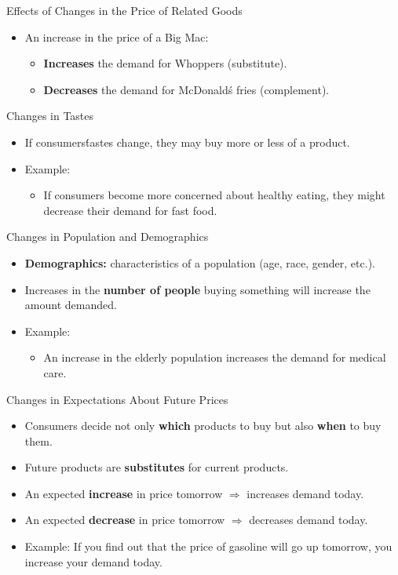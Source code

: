 \documentclass[aspectratio=169]{beamer}
\begin{document}
\begin{frame}{Effects of Changes in the Price of Related Goods}
\transfade
\begin{itemize}[<+->]
  \item An increase in the price of a Big Mac:
  \begin{itemize}[<+->]
    \item \textbf{Increases} the demand for Whoppers (substitute).
    \item \textbf{Decreases} the demand for McDonald\'s fries (complement).
  \end{itemize}
\end{itemize}
\end{frame}

\begin{frame}{Changes in Tastes}
\transfade
\begin{itemize}[<+->]
  \item If consumers\' tastes change, they may buy more or less of a product.
  \item Example:
  \begin{itemize}[<+->]
    \item If consumers become more concerned about healthy eating, they might decrease their demand for fast food.
  \end{itemize}
\end{itemize}
\end{frame}

\begin{frame}{Changes in Population and Demographics}
\transfade
\begin{itemize}[<+->]
  \item \textbf{Demographics:} characteristics of a population (age, race, gender, etc.).
  \item Increases in the \textbf{number of people} buying something will increase the amount demanded.
  \item Example:
  \begin{itemize}[<+->]
    \item An increase in the elderly population increases the demand for medical care.
  \end{itemize}
\end{itemize}
\end{frame}

\begin{frame}{Changes in Expectations About Future Prices}
\transfade
\begin{itemize}[<+->]
  \item Consumers decide not only \textbf{which} products to buy but also \textbf{when} to buy them.
  \item Future products are \textbf{substitutes} for current products.
  \item An expected \textbf{increase} in price tomorrow \(\Rightarrow\) increases demand today.
  \item An expected \textbf{decrease} in price tomorrow \(\Rightarrow\) decreases demand today.
  \item Example: If you find out that the price of gasoline will go up tomorrow, you increase your demand today.
\end{itemize}
\end{frame}
\end{document}
